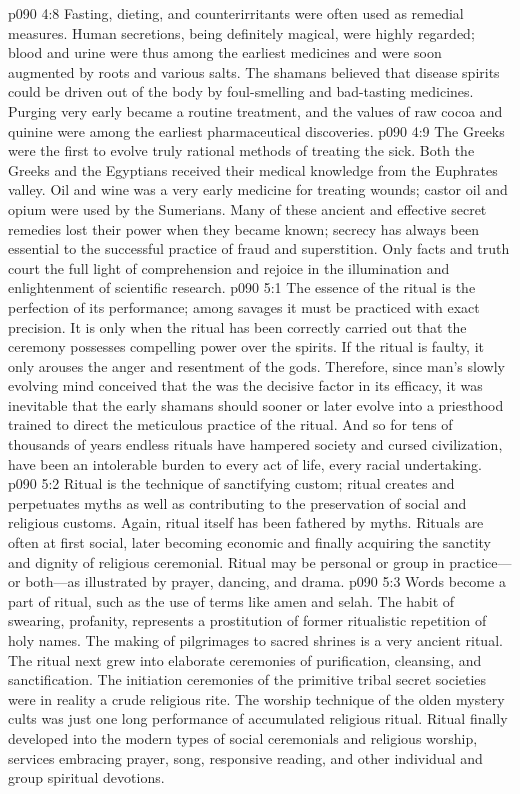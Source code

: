 \vs p090 4:8 Fasting, dieting, and counterirritants were often used as remedial measures. Human secretions, being definitely magical, were highly regarded; blood and urine were thus among the earliest medicines and were soon augmented by roots and various salts. The shamans believed that disease spirits could be driven out of the body by foul\hyp{}smelling and bad\hyp{}tasting medicines. Purging very early became a routine treatment, and the values of raw cocoa and quinine were among the earliest pharmaceutical discoveries.
\vs p090 4:9 The Greeks were the first to evolve truly rational methods of treating the sick. Both the Greeks and the Egyptians received their medical knowledge from the Euphrates valley. Oil and wine was a very early medicine for treating wounds; castor oil and opium were used by the Sumerians. Many of these ancient and effective secret remedies lost their power when they became known; secrecy has always been essential to the successful practice of fraud and superstition. Only facts and truth court the full light of comprehension and rejoice in the illumination and enlightenment of scientific research.
\vs p090 5:1 The essence of the ritual is the perfection of its performance; among savages it must be practiced with exact precision. It is only when the ritual has been correctly carried out that the ceremony possesses compelling power over the spirits. If the ritual is faulty, it only arouses the anger and resentment of the gods. Therefore, since man’s slowly evolving mind conceived that the  was the decisive factor in its efficacy, it was inevitable that the early shamans should sooner or later evolve into a priesthood trained to direct the meticulous practice of the ritual. And so for tens of thousands of years endless rituals have hampered society and cursed civilization, have been an intolerable burden to every act of life, every racial undertaking.
\vs p090 5:2 Ritual is the technique of sanctifying custom; ritual creates and perpetuates myths as well as contributing to the preservation of social and religious customs. Again, ritual itself has been fathered by myths. Rituals are often at first social, later becoming economic and finally acquiring the sanctity and dignity of religious ceremonial. Ritual may be personal or group in practice---or both---as illustrated by prayer, dancing, and drama.
\vs p090 5:3 Words become a part of ritual, such as the use of terms like amen and selah. The habit of swearing, profanity, represents a prostitution of former ritualistic repetition of holy names. The making of pilgrimages to sacred shrines is a very ancient ritual. The ritual next grew into elaborate ceremonies of purification, cleansing, and sanctification. The initiation ceremonies of the primitive tribal secret societies were in reality a crude religious rite. The worship technique of the olden mystery cults was just one long performance of accumulated religious ritual. Ritual finally developed into the modern types of social ceremonials and religious worship, services embracing prayer, song, responsive reading, and other individual and group spiritual devotions.
